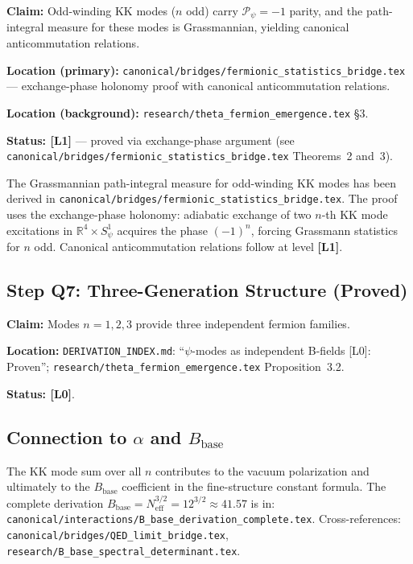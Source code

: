 \textbf{Claim:} Odd-winding KK modes ($n$ odd) carry $\mathcal{P}_\psi = -1$
parity, and the path-integral measure for these modes is Grassmannian,
yielding canonical anticommutation relations.

\textbf{Location (primary):} \texttt{canonical/bridges/fermionic\_statistics\_bridge.tex}
— exchange-phase holonomy proof with canonical anticommutation relations.

\textbf{Location (background):} \texttt{research/theta\_fermion\_emergence.tex} §3.

\textbf{Status: [L1]} — proved via exchange-phase argument
(see \texttt{canonical/bridges/fermionic\_statistics\_bridge.tex}
Theorems~2 and~3).

\begin{tcolorbox}[colback=green!5!white,colframe=green!50!black,title=Gap Q6 Closed]
  The Grassmannian path-integral measure for odd-winding KK modes has been
  derived in \texttt{canonical/bridges/fermionic\_statistics\_bridge.tex}.
  The proof uses the exchange-phase holonomy: adiabatic exchange of two
  $n$-th KK mode excitations in $\mathbb{R}^4\times S^1_\psi$ acquires the
  phase $(-1)^n$, forcing Grassmann statistics for $n$ odd.
  Canonical anticommutation relations follow at level \textbf{[L1]}.
\end{tcolorbox}

\subsection{Step Q7: Three-Generation Structure (Proved)}

\textbf{Claim:} Modes $n=1,2,3$ provide three independent fermion families.

\textbf{Location:} \texttt{DERIVATION\_INDEX.md}: ``$\psi$-modes as independent
B-fields [L0]: Proven''; \texttt{research/theta\_fermion\_emergence.tex}
Proposition~3.2.

\textbf{Status: [L0]}.

\subsection{Connection to \texorpdfstring{$\alpha$}{alpha} and \texorpdfstring{$B_{\mathrm{base}}$}{B\_base}}

The KK mode sum over all $n$ contributes to the vacuum polarization and
ultimately to the $B_{\mathrm{base}}$ coefficient in the fine-structure
constant formula.  The complete derivation $B_{\mathrm{base}} = N_{\mathrm{eff}}^{3/2}
= 12^{3/2} \approx 41.57$ is in:
\texttt{canonical/interactions/B\_base\_derivation\_complete.tex}.
Cross-references:
\texttt{canonical/bridges/QED\_limit\_bridge.tex},
\texttt{research/B\_base\_spectral\_determinant.tex}.


